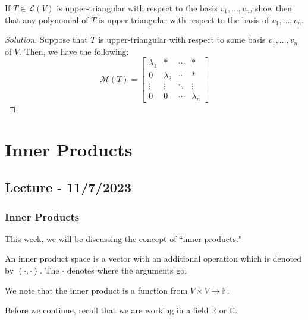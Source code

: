 \documentclass[openany]{book}
\newenvironment{solution}{\begin{proof}[Solution]}{\end{proof}}
\newcommand{\CC}{\mathbb{C}}
\newcommand{\RR}{\mathbb{R}}
\newcommand{\innerproduct}[2]{\left\langle{#1}, {#2}\right\rangle}
\begin{document}
\begin{hw}
	If $T \in \mathcal L(V)$ is upper-triangular with respect to the basis $v_{1}, \ldots, v_{n}$, show then that any polynomial of $T$ is upper-triangular with respect to the basis of $v_{1}, \ldots, v_{n}$.
\end{hw}
\begin{solution}
	Suppose that $T$ is upper-triangular with respect to some basis $v_{1}, \ldots, v_{n}$ of $V$. Then, we have the following:
	\begin{equation*}
		\mathcal M(T) = \begin{bmatrix}
			\lambda_1 & * & \cdots & * \\
			0 & \lambda_2 & \cdots & * \\
			\vdots & \vdots & \ddots & \vdots \\
			0 & 0 & \cdots & \lambda_n
		\end{bmatrix}
	\end{equation*}
\end{solution}

\chapter{Inner Products}
\section{Lecture - 11/7/2023}
\subsection{Inner Products}
This week, we will be discussing the concept of ``inner products."

\begin{defn}
	An inner product space is a vector with an additional operation which is denoted by $\innerproduct{\cdot}{\cdot}$. The $\cdot$ denotes where the arguments go.
	
	We note that the inner product is a function from $V \times V \rightarrow \mathbb{F}$.
\end{defn}

Before we continue, recall that we are working in a field $\RR$ or $\CC$.
\end{document}
